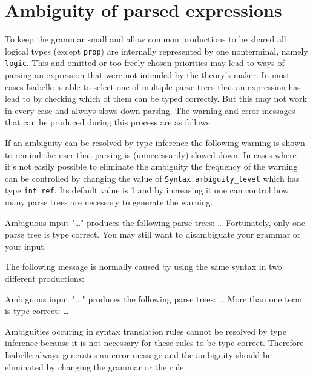 

\section{Ambiguity of parsed expressions} \label{sec:ambiguity}

To keep the grammar small and allow common productions to be shared
all logical types (except {\tt prop}) are internally represented
by one nonterminal, namely {\tt logic}.  This and omitted or too freely
chosen priorities may lead to ways of parsing an expression that were
not intended by the theory's maker.  In most cases Isabelle is able to
select one of multiple parse trees that an expression has lead
to by checking which of them can be typed correctly.  But this may not
work in every case and always slows down parsing.
The warning and error messages that can be produced during this process are
as follows:

If an ambiguity can be resolved by type inference the following
warning is shown to remind the user that parsing is (unnecessarily)
slowed down.  In cases where it's not easily possible to eliminate the
ambiguity the frequency of the warning can be controlled by changing
the value of {\tt Syntax.ambiguity_level} which has type {\tt int
ref}.  Its default value is 1 and by increasing it one can control how
many parse trees are necessary to generate the warning.

\begin{ttbox}
{\out Ambiguous input "\dots"}
{\out produces the following parse trees:}
{\out \dots}
{\out Fortunately, only one parse tree is type correct.}
{\out You may still want to disambiguate your grammar or your input.}
\end{ttbox}

The following message is normally caused by using the same
syntax in two different productions:

\begin{ttbox}
{\out Ambiguous input "..."}
{\out produces the following parse trees:}
{\out \dots}
{\out More than one term is type correct:}
{\out \dots}
\end{ttbox}

Ambiguities occuring in syntax translation rules cannot be resolved by
type inference because it is not necessary for these rules to be type
correct.  Therefore Isabelle always generates an error message and the
ambiguity should be eliminated by changing the grammar or the rule.


